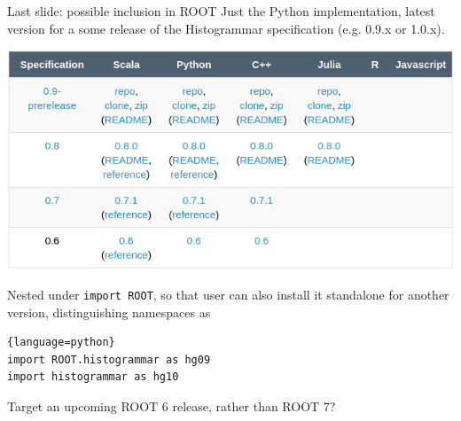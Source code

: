 \documentclass{beamer}
\begin{document}
\begin{frame}[fragile]{Last slide: possible inclusion in ROOT}
\vspace{0.25 cm}
Just the Python implementation, latest version for a some release of the Histogrammar specification (e.g. 0.9.x or 1.0.x).

\begin{center}
\includegraphics[width=0.75\linewidth]{release_matrix.png}
\end{center}

Nested under {\tt\small import ROOT}, so that user can also install it standalone for another version, distinguishing namespaces as

\hfill\begin{minipage}{0.95\linewidth}
\begin{lstlisting}{language=python}
import ROOT.histogrammar as hg09
import histogrammar as hg10
\end{lstlisting}
\end{minipage}

\vfill
Target an upcoming ROOT 6 release, rather than ROOT 7?
\end{frame}
\end{document}
